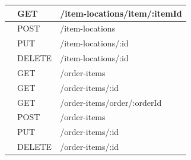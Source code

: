 \begin{xltabular}{\textwidth}{ | >{\raggedright\arraybackslash}p{1cm} | >{\raggedright\arraybackslash}p{2cm} | >{\raggedright\arraybackslash}X | }
     & GET & /item-locations/item/:itemId \\
     & POST & /item-locations \\
     & PUT & /item-locations/:id \\
     & DELETE & /item-locations/:id \\
     & GET & /order-items \\
     & GET & /order-items/:id \\
     & GET & /order-items/order/:orderId \\
     & POST & /order-items \\
     & PUT & /order-items/:id \\
     & DELETE & /order-items/:id \\
    \hline
\end{xltabular}

